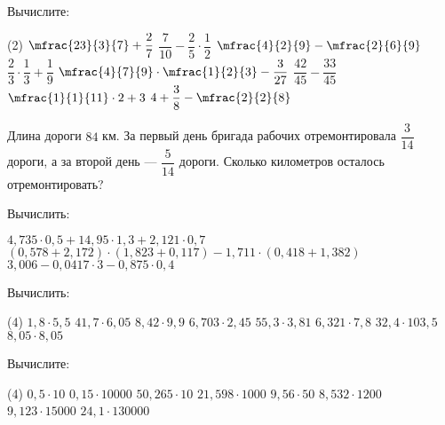 \begin{homework}[number=3]
	\begin{listofex}
		\item Вычислите:
		\begin{tasks}(2)
			\task \( \mfrac{23}{3}{7}+\dfrac{2}{7} \)
			\task \( \dfrac{7}{10} - \dfrac{2}{5}\cdot\dfrac{1}{2}\)
			\task \( \mfrac{4}{2}{9}-\mfrac{2}{6}{9} \)
			\task \( \dfrac{2}{3}\cdot\dfrac{1}{3}+\dfrac{1}{9} \)
			\task \( \mfrac{4}{7}{9}\cdot\mfrac{1}{2}{3}-\dfrac{3}{27} \)
			\task \( \dfrac{42}{45}-\dfrac{33}{45} \)
			\task \( \mfrac{1}{1}{11}\cdot2+3\)
			\task \( 4+\dfrac{3}{8}-\mfrac{2}{2}{8} \)
		\end{tasks}
		\item Длина дороги \( 84 \) км. За первый день бригада рабочих отремонтировала \(\dfrac{ 3}{14} \) дороги, а за второй день --- \( \dfrac{5}{14} \) дороги. Сколько километров осталось отремонтировать? 
	\end{listofex}
\end{homework}

\begin{class}[number=7]
	\begin{listofex}
		\item Вычислить:
		\begin{tasks}
			\task \( 4,735\cdot0,5+14,95\cdot1,3+2,121\cdot0,7 \)
			\task \( (0,578+2,172)\cdot(1,823+0,117)-1,711\cdot(0,418+1,382) \)
			\task \( 3,006-0,0417\cdot3-0,875\cdot0,4 \)
		\end{tasks}
		\item Вычислить:
		\begin{tasks}(4)
			\task \( 1,8\cdot5,5 \)
			\task \( 41,7\cdot6,05 \)
			\task \( 8,42\cdot9,9 \)
			\task \( 6,703\cdot2,45 \)
			\task \( 55,3\cdot3,81 \)
			\task \( 6,321\cdot7,8 \)
			\task \( 32,4\cdot103,5 \)
			\task \( 8,05\cdot8,05 \)
		\end{tasks}
		\item Вычислите:
		\begin{tasks}(4)
			\task \( 0,5\cdot10 \)
			\task \( 0,15\cdot10000 \)
			\task \( 50,265\cdot10 \)
			\task \( 21,598\cdot1000 \)
			\task \( 9,56\cdot50 \)
			\task \( 8,532\cdot1200 \)
			\task \( 9,123\cdot15000 \)
			\task \( 24,1\cdot130000 \)
		\end{tasks}

	\end{listofex}
\end{class}

